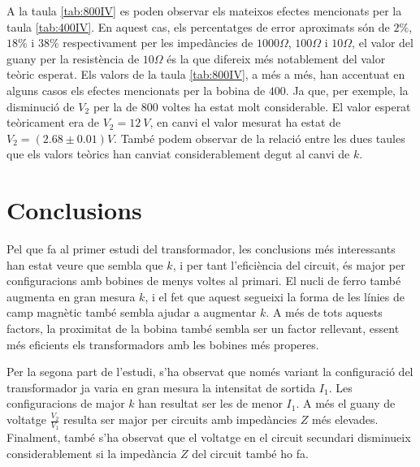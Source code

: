 A la taula \cref{tab:800IV} es poden observar els mateixos efectes mencionats per la taula \cref{tab:400IV}. En aquest cas, els percentatges de error aproximats són de $2\%$, $18\%$ i $38\%$ respectivament per les impedàncies de $1000\si{\Omega}$,  $100\si{\Omega}$  i  $10\si{\Omega}$, el valor del guany per la resistència de $10\si{\Omega}$ és la que difereix més notablement del valor teòric esperat. Els valors de la taula \cref{tab:800IV}, a més a més, han accentuat en alguns casos els efectes mencionats per la bobina de $400$. Ja que, per exemple, la disminució de $V_2$  per la de $800$ voltes ha estat molt considerable. El valor esperat teòricament era de $V_2=\SI{12}{V}$, en canvi el valor mesurat ha estat de $V_2=(2.68 \pm 0.01) \si{V}$. També podem observar de la relació entre les dues taules que els valors teòrics han canviat considerablement degut al canvi de $k$. 

\section{Conclusions}

Pel que fa al primer estudi del transformador, les conclusions més interessants han estat veure que sembla que $k$, i per tant l'eficiència del circuit, és major per configuracions amb bobines de menys voltes al primari. El nucli de ferro també augmenta en gran mesura $k$, i el fet que aquest segueixi la forma de les línies de camp magnètic també sembla ajudar a augmentar $k$. A més de tots aquests factors, la proximitat de la bobina també sembla ser un factor rellevant, essent més eficients els transformadors amb les bobines més properes.
\newline

Per la segona part de l'estudi, s'ha observat que només variant la configuració del transformador ja varia en gran mesura la intensitat de sortida $I_1$. Les configuracions de major $k$ han resultat ser les de menor $I_1$. A més el guany de voltatge $\frac{V_2}{V_1}$ resulta ser major per circuits amb impedàncies $Z$ més elevades. Finalment, també s'ha observat que el voltatge en el circuit secundari disminueix considerablement si la impedància $Z$ del circuit també ho fa.